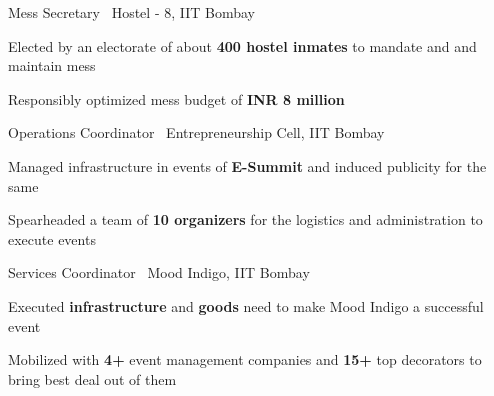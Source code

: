 \begin{cventries}
    \cventry
    {}
    {Mess Secretary \textbar \ Hostel - 8, IIT Bombay}
    {\color{darkgray}{(August'17 - April'18)}}
    {}
    {
      \begin{cvitems}
        \item{Elected by an electorate of about \textbf{400 hostel inmates} to mandate and and maintain mess}
        \item{Responsibly optimized mess budget of \textbf{INR 8 million}}
      \end{cvitems}
    }
    \cventry
     {}
     {Operations Coordinator \textbar \ Entrepreneurship Cell, IIT Bombay}
     {\color{darkgray}{(June’17 - February’18)}}
     {}
     {
       \begin{cvitems}
         \item{Managed infrastructure in events of \textbf{E-Summit} and induced publicity for the same}
         \item{Spearheaded a team of \textbf{10 organizers} for the logistics and administration to execute events}
       \end{cvitems}
     }
    \cventry
    {}
    {Services Coordinator \textbar \ Mood Indigo, IIT Bombay}
    {\color{darkgray}{(May’17 - January’18)}}
    {}
    {
      \begin{cvitems}
        \item{Executed \textbf{infrastructure} and \textbf{goods} need to make Mood Indigo a successful event}
        \item{Mobilized with \textbf{4+} event management companies and \textbf{15+} top decorators to bring best deal out of them}
      \end{cvitems}
    }
\end{cventries}
